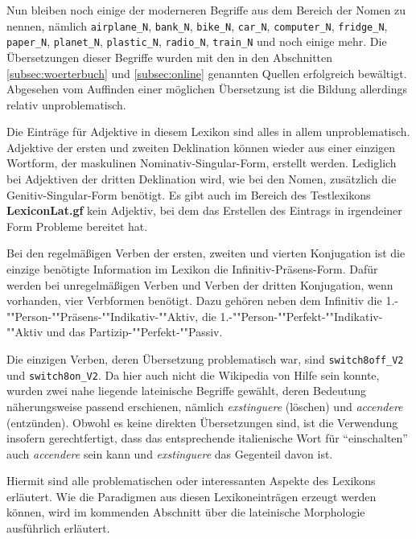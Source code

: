 Nun bleiben noch einige der moderneren Begriffe aus dem Bereich der Nomen zu nennen, nämlich \texttt{airplane\_N}, \texttt{bank\_N}, \texttt{bike\_N}, \texttt{car\_N}, \texttt{computer\_N}, \texttt{fridge\_N}, \texttt{paper\_N}, \texttt{planet\_N}, \texttt{plastic\_N}, \texttt{radio\_N}, \texttt{train\_N} und noch einige mehr. Die Übersetzungen dieser Begriffe wurden mit den in den Abschnitten \ref{subsec:woerterbuch} und \ref{subsec:online} genannten Quellen erfolgreich bewältigt. Abgesehen vom Auffinden einer möglichen Übersetzung ist die Bildung allerdings relativ unproblematisch. \par
Die Einträge für Adjektive in diesem Lexikon sind alles in allem unproblematisch. Adjektive der ersten und zweiten Deklination können wieder aus einer einzigen Wortform, der maskulinen Nominativ-Singular-Form, erstellt werden. Lediglich bei Adjektiven der dritten Deklination wird, wie bei den Nomen, zusätzlich die Genitiv-Singular-Form benötigt. Es gibt auch im Bereich des Testlexikons \textbf{LexiconLat.gf} kein Adjektiv, bei dem das Erstellen des Eintrags in irgendeiner Form Probleme bereitet hat. \par
Bei den regelmäßigen Verben der ersten, zweiten und vierten Konjugation ist die einzige benötigte Information im Lexikon die Infinitiv-Präsens-Form. Dafür werden bei unregelmäßigen Verben und Verben der dritten Konjugation, wenn vorhanden, vier Verbformen benötigt. Dazu gehören neben dem Infinitiv die 1.-""Person-""Präsens-""Indikativ-""Aktiv, die 1.-""Person-""Perfekt-""Indikativ-""Aktiv und das Partizip-""Perfekt-""Passiv. \par
Die einzigen Verben, deren Übersetzung problematisch war, sind \texttt{switch8off\_V2} und \texttt{switch8on\_V2}. Da hier auch nicht die Wikipedia von Hilfe sein konnte, wurden zwei nahe liegende lateinische Begriffe gewählt, deren Bedeutung näherungsweise passend erschienen, nämlich \textit{exstinguere} (löschen) und \textit{accendere} (entzünden). Obwohl es keine direkten Übersetzungen sind, ist die Verwendung insofern gerechtfertigt, dass das entsprechende italienische Wort für ``einschalten'' auch \textit{accendere} sein kann und \textit{exstinguere} das Gegenteil davon ist. \par
Hiermit sind alle problematischen oder interessanten Aspekte des Lexikons erläutert. Wie die Paradigmen aus diesen Lexikoneinträgen erzeugt werden können, wird im kommenden Abschnitt über die lateinische Morphologie ausführlich erläutert.